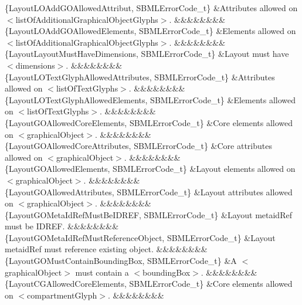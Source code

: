 \begin{DoxyParagraph}{}
\begin{longtabu}
\{Layout\+L\+O\+Add\+G\+O\+Allowed\+Attribut, S\+B\+M\+L\+Error\+Code\+\_\+t\} &Attributes allowed on {\ttfamily $<$list\+Of\+Additional\+Graphical\+Object\+Glyphs$>$}. &&&&&&&&\\
\{Layout\+L\+O\+Add\+G\+O\+Allowed\+Elements, S\+B\+M\+L\+Error\+Code\+\_\+t\} &Elements allowed on {\ttfamily $<$list\+Of\+Additional\+Graphical\+Object\+Glyphs$>$}. &&&&&&&&\\
\{Layout\+Layout\+Must\+Have\+Dimensions, S\+B\+M\+L\+Error\+Code\+\_\+t\} &Layout must have {\ttfamily $<$dimensions$>$}. &&&&&&&&\\
\{Layout\+L\+O\+Text\+Glyph\+Allowed\+Attributes, S\+B\+M\+L\+Error\+Code\+\_\+t\} &Attributes allowed on {\ttfamily $<$list\+Of\+Text\+Glyphs$>$}. &&&&&&&&\\
\{Layout\+L\+O\+Text\+Glyph\+Allowed\+Elements, S\+B\+M\+L\+Error\+Code\+\_\+t\} &Elements allowed on {\ttfamily $<$list\+Of\+Text\+Glyphs$>$}. &&&&&&&&\\
\{Layout\+G\+O\+Allowed\+Core\+Elements, S\+B\+M\+L\+Error\+Code\+\_\+t\} &Core elements allowed on {\ttfamily $<$graphical\+Object$>$}. &&&&&&&&\\
\{Layout\+G\+O\+Allowed\+Core\+Attributes, S\+B\+M\+L\+Error\+Code\+\_\+t\} &Core attributes allowed on {\ttfamily $<$graphical\+Object$>$}. &&&&&&&&\\
\{Layout\+G\+O\+Allowed\+Elements, S\+B\+M\+L\+Error\+Code\+\_\+t\} &Layout elements allowed on {\ttfamily $<$graphical\+Object$>$}. &&&&&&&&\\
\{Layout\+G\+O\+Allowed\+Attributes, S\+B\+M\+L\+Error\+Code\+\_\+t\} &Layout attributes allowed on {\ttfamily $<$graphical\+Object$>$}. &&&&&&&&\\
\{Layout\+G\+O\+Meta\+Id\+Ref\+Must\+Be\+I\+D\+R\+EF, S\+B\+M\+L\+Error\+Code\+\_\+t\} &Layout \textquotesingle{}metaid\+Ref\textquotesingle{} must be I\+D\+R\+EF. &&&&&&&&\\
\{Layout\+G\+O\+Meta\+Id\+Ref\+Must\+Reference\+Object, S\+B\+M\+L\+Error\+Code\+\_\+t\} &Layout \textquotesingle{}metaid\+Ref\textquotesingle{} must reference existing object. &&&&&&&&\\
\{Layout\+G\+O\+Must\+Contain\+Bounding\+Box, S\+B\+M\+L\+Error\+Code\+\_\+t\} &A {\ttfamily $<$graphical\+Object$>$} must contain a {\ttfamily $<$bounding\+Box$>$}. &&&&&&&&\\
\{Layout\+C\+G\+Allowed\+Core\+Elements, S\+B\+M\+L\+Error\+Code\+\_\+t\} &Core elements allowed on {\ttfamily $<$compartment\+Glyph$>$}. &&&&&&&&\\

\end{longtabu}
\end{DoxyParagraph}
